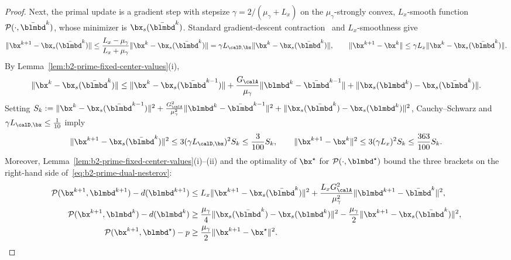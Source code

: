 \begin{proof}
Next, the primal update is a gradient step with stepsize
\(\gamma=2/(\mu_\gamma+L_x)\) on the \(\mu_\gamma\)-strongly convex,
\(L_x\)-smooth function \(\mathcal P(\cdot,\bar{\blmbd}^k)\), whose minimizer
is \(\bx_s(\bar{\blmbd}^k)\). Standard gradient-descent contraction~\cite{nesterov2018lectures}
and \(L_x\)-smoothness give
\[
    \|\bx^{k+1}-\bx_s(\bar{\blmbd}^k)\|
    \le\frac{L_x-\mu_\gamma}{L_x+\mu_\gamma}\|\bx^k-\bx_s(\bar{\blmbd}^k)\|
    =\gamma L_{\calD,\bx}\|\bx^k-\bx_s(\bar{\blmbd}^k)\|,
    \qquad
    \|\bx^{k+1}-\bx^k\|\le\gamma L_x\|\bx^k-\bx_s(\bar{\blmbd}^k)\|.
\]
By Lemma~\ref{lem:b2-prime-fixed-center-values}(i),
\[
    \|\bx^k-\bx_s(\bar{\blmbd}^k)\|
    \le\|\bx^k-\bx_s(\bar{\blmbd}^{k-1})\|
    +\frac{G_{\calA}}{\mu_\gamma}\|\blmbd^k-\bar{\blmbd}^{k-1}\|
    +\|\bx_s(\blmbd^k)-\bx_s(\bar{\blmbd}^k)\|.
\]
Setting
\(S_k:=\|\bx^k-\bx_s(\bar{\blmbd}^{k-1})\|^2
+\frac{G_{\calA}^2}{\mu_\gamma^2}\|\blmbd^k-\bar{\blmbd}^{k-1}\|^2
+\|\bx_s(\bar{\blmbd}^k)-\bx_s(\blmbd^k)\|^2\), Cauchy--Schwarz and
\(\gamma L_{\calD,\bx}\le\frac{1}{10}\) imply
\begin{equation}
\label{eq:b2-prime-tracking}
    \|\bx^{k+1}-\bx_s(\bar{\blmbd}^k)\|^2
    \le3(\gamma L_{\calD,\bx})^2S_k\le\frac{3}{100}S_k,
    \qquad
    \|\bx^{k+1}-\bx^k\|^2
    \le3(\gamma L_x)^2S_k\le\frac{363}{100}S_k .
\end{equation}
Moreover, Lemma~\ref{lem:b2-prime-fixed-center-values}(i)--(ii) and the
optimality of \(\bx^\star\) for \(\mathcal P(\cdot,\blmbd^\star)\) bound the
three brackets on the right-hand side of~\eqref{eq:b2-prime-dual-nesterov}:
\[
\begin{aligned}
    \mathcal P(\bx^{k+1},\blmbd^{k+1})-d(\blmbd^{k+1})
    &\le L_x\|\bx^{k+1}-\bx_s(\bar{\blmbd}^k)\|^2
    +\frac{L_xG_{\calA}^2}{\mu_\gamma^2}\|\blmbd^{k+1}-\bar{\blmbd}^k\|^2,\\
    \mathcal P(\bx^{k+1},\blmbd^k)-d(\blmbd^k)
    &\ge\frac{\mu_\gamma}{4}\|\bx_s(\bar{\blmbd}^k)-\bx_s(\blmbd^k)\|^2
    -\frac{\mu_\gamma}{2}\|\bx^{k+1}-\bx_s(\bar{\blmbd}^k)\|^2,\\
    \mathcal P(\bx^{k+1},\blmbd^\star)-p
    &\ge\frac{\mu_\gamma}{2}\|\bx^{k+1}-\bx^\star\|^2 .
\end{aligned}
\]


\end{proof}
